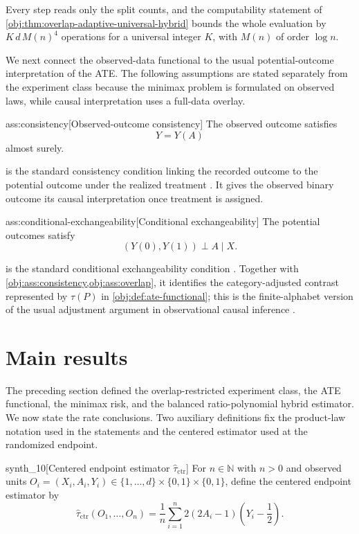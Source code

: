 \documentclass[11pt]{article}
\begin{document}
Every step reads only the split counts, and the computability statement of \cref{obj:thm:overlap-adaptive-universal-hybrid} bounds the whole evaluation by \(K\,d\,M(n)^4\) operations for a universal integer \(K\), with \(M(n)\) of order \(\log n\).

We next connect the observed-data functional to the usual potential-outcome interpretation of the ATE. The following assumptions are stated separately from the experiment class because the minimax problem is formulated on observed laws, while causal interpretation uses a full-data overlay.

\begin{assumptionv}{ass:consistency}[Observed-outcome consistency]
The observed outcome satisfies
\[
Y=Y(A)
\]
almost surely.
\end{assumptionv}

 is the standard consistency condition linking the recorded outcome to the potential outcome under the realized treatment \citep{ZengBalakrishnanHanKennedy2024}. It gives the observed binary outcome its causal interpretation once treatment is assigned.

\begin{assumptionv}{ass:conditional-exchangeability}[Conditional exchangeability]
The potential outcomes satisfy
\[
(Y(0),Y(1))\perp A\mid X .
\]
\end{assumptionv}

 is the standard conditional exchangeability condition \citep{ZengBalakrishnanHanKennedy2024}. Together with \cref{obj:ass:consistency,obj:ass:overlap}, it identifies the category-adjusted contrast represented by \(\tau(P)\) in \cref{obj:def:ate-functional}; this is the finite-alphabet version of the usual adjustment argument in observational causal inference \citep{Rubin1974,RosenbaumRubin1983}.


\section{Main results}

The preceding section defined the overlap-restricted experiment class, the ATE functional, the minimax risk, and the balanced ratio-polynomial hybrid estimator. We now state the rate conclusions. Two auxiliary definitions fix the product-law notation used in the statements and the centered estimator used at the randomized endpoint.

\begin{definitionv}{synth_10}[Centered endpoint estimator $\widehat\tau_{\mathrm{ctr}}$]
For \(n\in\mathbb N\) with \(n>0\) and observed units \(O_i=(X_i,A_i,Y_i)\in\{1,\ldots,d\}\times\{0,1\}\times\{0,1\}\), define the centered endpoint estimator by \[ \widehat\tau_{\mathrm{ctr}}(O_1,\ldots,O_n)=\frac1n\sum_{i=1}^n 2(2A_i-1)\left(Y_i-\frac12\right). \]
\end{definitionv}
\end{document}
